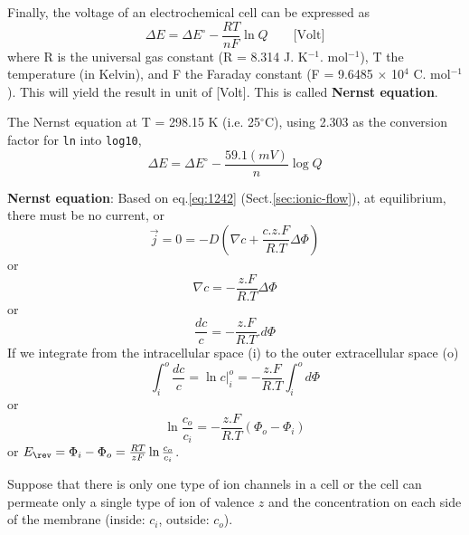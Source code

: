 Finally, the  voltage of an electrochemical cell can be expressed as
\begin{equation}
\Delta E = \Delta E^\circ - \frac{RT}{nF} \ln Q \qquad \text{[Volt]}
\end{equation}
where R is the universal gas constant (R = 8.314 J. K$^{-1}$. mol$^{-1}$), T
the temperature (in Kelvin), and F the Faraday constant
(F = 9.6485 $\times$ 10$^{4}$ C. mol$^{-1}$). This will yield the result in unit
of [Volt]. This is called {\bf Nernst equation}.

The Nernst equation at T = 298.15 K (i.e. 25$^\circ$C), using 2.303 as the
conversion factor for \verb!ln! into \verb!log10!,
\begin{equation}
\Delta E = \Delta E^\circ - \frac{59.1 (mV)}{n} \log Q
\end{equation}



\begin{mdframed}
  {\bf Nernst equation}: Based on eq.\ref{eq:1242} (Sect.\ref{sec:ionic-flow}),
  at equilibrium, there must be no current, or
  \begin{equation}
    \label{eq:1229}
    \overrightarrow{j} = 0 =     -D (\nabla c +
    \frac{c.z.F}{R.T}\Delta \Phi)  
  \end{equation}
or
\begin{equation}
  \label{eq:1230}
  \nabla c = -\frac{z.F}{R.T}\Delta \Phi 
\end{equation}
or
\begin{equation}
  \label{eq:1231}
  \frac{dc}{c} = -\frac{z.F}{R.T} .d\Phi 
\end{equation}
If we integrate from the intracellular space (i) to the outer
extracellular space (o)
\begin{equation}
  \label{eq:1232}
  \int^o_i  \frac{dc}{c} = \ln c|^o_i = -\frac{z.F}{R.T} \int^o_i d\Phi 
\end{equation}
or 
\begin{equation}
  \label{eq:1233}
  \ln \frac{c_o}{c_i} = -\frac{z.F}{R.T} (\Phi_o-\Phi_i)
\end{equation}
or $E_\rev = \Phi_i - \Phi_o = \frac{RT}{zF}\ln\frac{c_o}{c_i}$.
\end{mdframed}

Suppose that there is only one type of ion channels in a cell or the cell can
permeate only a single type of ion of valence $z$ and the concentration on each
side of the membrane (inside: $c_i$, outside: $c_o$).

